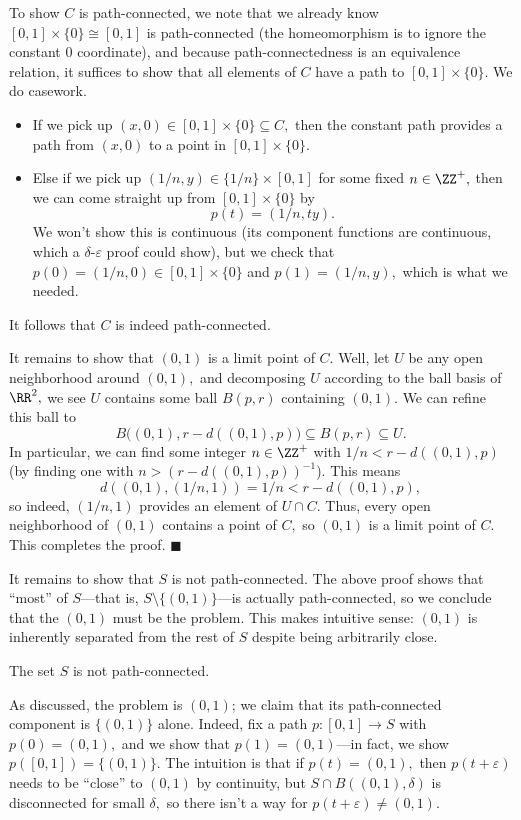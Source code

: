 To show $C$ is path-connected, we note that we already know $[0,1]\times\{0\}\cong[0,1]$ is path-connected (the homeomorphism is to ignore the constant $0$ coordinate), and because path-connectedness is an equivalence relation, it suffices to show that all elements of $C$ have a path to $[0,1]\times\{0\}.$ We do casework.
\begin{itemize}
    \item If we pick up $(x,0)\in[0,1]\times\{0\}\subseteq C,$ then the constant path provides a path from $(x,0)$ to a point in $[0,1]\times\{0\}.$
    \item Else if we pick up $(1/n,y)\in\{1/n\}\times[0,1]$ for some fixed $n\in\ZZ^+,$ then we can come straight up from $[0,1]\times\{0\}$ by
    \[p(t)=(1/n,ty).\]
    We won't show this is continuous (its component functions are continuous, which a $\delta$-$\varepsilon$ proof could show), but we check that $p(0)=(1/n,0)\in[0,1]\times\{0\}$ and $p(1)=(1/n,y),$ which is what we needed.
\end{itemize}
It follows that $C$ is indeed path-connected.

It remains to show that $(0,1)$ is a limit point of $C.$ Well, let $U$ be any open neighborhood around $(0,1),$ and decomposing $U$ according to the ball basis of $\RR^2,$ we see $U$ contains some ball $B(p,r)$ containing $(0,1).$ We can refine this ball to
\[B\big((0,1),r-d((0,1),p)\big)\subseteq B(p,r)\subseteq U.\]
In particular, we can find some integer $n\in\ZZ^+$ with $1/n<r-d((0,1),p)$ (by finding one with $n>(r-d((0,1),p))^{-1}$). This means
\[d((0,1),(1/n,1))=1/n<r-d((0,1),p),\]
so indeed, $(1/n,1)$ provides an element of $U\cap C.$ Thus, every open neighborhood of $(0,1)$ contains a point of $C,$ so $(0,1)$ is a limit point of $C.$ This completes the proof. $\blacksquare$

It remains to show that $S$ is not path-connected. The above proof shows that ``most'' of $S$---that is, $S\setminus\{(0,1)\}$---is actually path-connected, so we conclude that the $(0,1)$ must be the problem. This makes intuitive sense: $(0,1)$ is inherently separated from the rest of $S$ despite being arbitrarily close.
\begin{lemma}
    The set $S$ is not path-connected.
\end{lemma}
As discussed, the problem is $(0,1)$; we claim that its path-connected component is $\{(0,1)\}$ alone. Indeed, fix a path $p:[0,1]\to S$ with $p(0)=(0,1),$ and we show that $p(1)=(0,1)$---in fact, we show $p([0,1])=\{(0,1)\}.$ The intuition is that if $p(t)=(0,1),$ then $p(t+\varepsilon)$ needs to be ``close'' to $(0,1)$ by continuity, but $S\cap B((0,1),\delta)$ is disconnected for small $\delta,$ so there isn't a way for $p(t+\varepsilon)\ne(0,1).$

